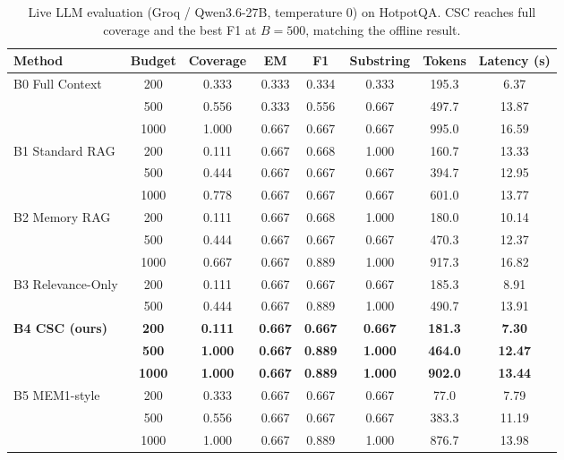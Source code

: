 \documentclass{article}
\begin{document}
\begin{table}[t]
\caption{Live LLM evaluation (Groq / Qwen3.6-27B, temperature 0) on HotpotQA. CSC reaches full coverage and the best F1 at $B=500$, matching the offline result.}
\label{tab:llm-eval}
\centering
\small
\begin{tabular}{lccccccc}
\toprule
Method & Budget & Coverage & EM & F1 & Substring & Tokens & Latency (s) \\
\midrule
B0 Full Context   & 200 & 0.333 & 0.333 & 0.334 & 0.333 & 195.3 & 6.37 \\
                   & 500 & 0.556 & 0.333 & 0.556 & 0.667 & 497.7 & 13.87 \\
                   & 1000 & 1.000 & 0.667 & 0.667 & 0.667 & 995.0 & 16.59 \\
B1 Standard RAG    & 200 & 0.111 & 0.667 & 0.668 & 1.000 & 160.7 & 13.33 \\
                   & 500 & 0.444 & 0.667 & 0.667 & 0.667 & 394.7 & 12.95 \\
                   & 1000 & 0.778 & 0.667 & 0.667 & 0.667 & 601.0 & 13.77 \\
B2 Memory RAG      & 200 & 0.111 & 0.667 & 0.668 & 1.000 & 180.0 & 10.14 \\
                   & 500 & 0.444 & 0.667 & 0.667 & 0.667 & 470.3 & 12.37 \\
                   & 1000 & 0.667 & 0.667 & 0.889 & 1.000 & 917.3 & 16.82 \\
B3 Relevance-Only  & 200 & 0.111 & 0.667 & 0.667 & 0.667 & 185.3 & 8.91 \\
                   & 500 & 0.444 & 0.667 & 0.889 & 1.000 & 490.7 & 13.91 \\
\textbf{B4 CSC (ours)} & \textbf{200} & \textbf{0.111} & \textbf{0.667} & \textbf{0.667} & \textbf{0.667} & \textbf{181.3} & \textbf{7.30} \\
                   & \textbf{500} & \textbf{1.000} & \textbf{0.667} & \textbf{0.889} & \textbf{1.000} & \textbf{464.0} & \textbf{12.47} \\
                   & \textbf{1000} & \textbf{1.000} & \textbf{0.667} & \textbf{0.889} & \textbf{1.000} & \textbf{902.0} & \textbf{13.44} \\
B5 MEM1-style      & 200 & 0.333 & 0.667 & 0.667 & 0.667 & 77.0 & 7.79 \\
                   & 500 & 0.556 & 0.667 & 0.667 & 0.667 & 383.3 & 11.19 \\
                   & 1000 & 1.000 & 0.667 & 0.889 & 1.000 & 876.7 & 13.98 \\
\bottomrule
\end{tabular}
\end{table}
\end{document}
